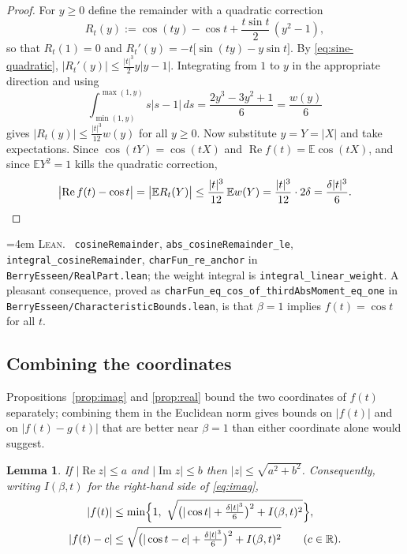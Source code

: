 \documentclass[10pt,a4paper]{article}
\theoremstyle{plain}
\newtheorem{lemma}[theorem]{Lemma}
\theoremstyle{definition}
\newcommand{\R}{\mathbb{R}}
\newcommand{\E}{\mathbb{E}}
\newcommand{\lean}[1]{\texttt{#1}}
\newcommand{\file}[1]{\texttt{#1}}
\DeclareMathOperator{\Rea}{Re}
\DeclareMathOperator{\Ima}{Im}
\newenvironment{leanref}%
  {\par\addvspace{3pt}\begingroup\sloppy\emergencystretch=4em
   \noindent\footnotesize\textsc{Lean.}\ \ignorespaces}%
  {\par\endgroup\addvspace{3pt}}
\begin{document}
\begin{proof}
For $y\ge0$ define the remainder with a quadratic correction
\[
  R_t(y) := \cos(ty)-\cos t + \frac{t\sin t}{2}\,(y^2-1),
\]
so that $R_t(1)=0$ and $R_t'(y)=-t\bigl[\sin(ty)-y\sin t\bigr]$. By
\eqref{eq:sine-quadratic}, $|R_t'(y)|\le\tfrac{|t|^3}{2}y|y-1|$. Integrating
from $1$ to $y$ in the appropriate direction and using
\[
  \int_{\min(1,y)}^{\max(1,y)} s|s-1|\,ds = \frac{2y^3-3y^2+1}{6}
  = \frac{w(y)}{6}
\]
gives $|R_t(y)|\le\tfrac{|t|^3}{12}w(y)$ for all $y\ge0$. Now substitute
$y=Y=|X|$ and take expectations. Since $\cos(tY)=\cos(tX)$ and
$\Rea f(t)=\E\cos(tX)$, and since $\E Y^2=1$ kills the quadratic correction,
\[
  \bigl|\Rea f(t)-\cos t\bigr| = \bigl|\E R_t(Y)\bigr|
  \le \frac{|t|^3}{12}\,\E w(Y) = \frac{|t|^3}{12}\cdot2\delta
  = \frac{\delta|t|^3}{6}. \qedhere
\]
\end{proof}

\begin{leanref}
\lean{cosineRemainder}, \lean{abs\_cosineRemainder\_le},
\lean{integral\_cosineRemainder}, \lean{charFun\_re\_anchor} in
\file{BerryEsseen/RealPart.lean}; the weight integral is
\lean{integral\_linear\_weight}. A pleasant consequence, proved as
\lean{charFun\_eq\_cos\_of\_thirdAbsMoment\_eq\_one} in
\file{BerryEsseen/CharacteristicBounds.lean}, is that $\beta=1$ implies
$f(t)=\cos t$ for all $t$.
\end{leanref}

\subsection{Combining the coordinates}

Propositions~\ref{prop:imag} and \ref{prop:real} bound the two coordinates of
$f(t)$ separately; combining them in the Euclidean norm gives bounds on
$|f(t)|$ and on $|f(t)-g(t)|$ that are better near $\beta=1$ than either
coordinate alone would suggest.

\begin{lemma}\label{lem:coordinate-combination}
If $|\Rea z|\le a$ and $|\Ima z|\le b$ then $|z|\le\sqrt{a^2+b^2}$.
Consequently, writing $I(\beta,t)$ for the right-hand side of
\eqref{eq:imag},
\begin{align}
  |f(t)| &\le \min\Bigl\{1,\ \sqrt{\bigl(|\cos t|+\tfrac{\delta|t|^3}{6}\bigr)^2
    + I(\beta,t)^2}\Bigr\}, \label{eq:mod-anchor}\\
  |f(t)-c| &\le \sqrt{\bigl(|\cos t-c|+\tfrac{\delta|t|^3}{6}\bigr)^2
    + I(\beta,t)^2} \qquad (c\in\R). \label{eq:err-anchor}
\end{align}
\end{lemma}
\end{document}
